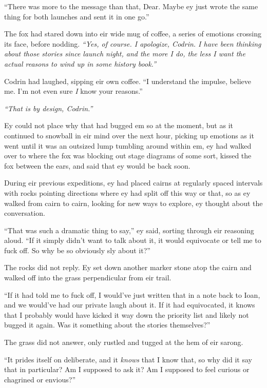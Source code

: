 ``There was more to the message than that, Dear. Maybe ey just wrote the same thing for both launches and sent it in one go.''

The fox had stared down into eir wide mug of coffee, a series of emotions crossing its face, before nodding. \emph{``Yes, of course. I apologize, Codrin. I have been thinking about those stories since launch night, and the more I do, the less I want the actual reasons to wind up in some history book.''}

Codrin had laughed, sipping eir own coffee. ``I understand the impulse, believe me. I'm not even sure \emph{I} know your reasons.''

\emph{``That is by design, Codrin.''}

Ey could not place why that had bugged em so at the moment, but as it continued to snowball in eir mind over the next hour, picking up emotions as it went until it was an outsized lump tumbling around within em, ey had walked over to where the fox was blocking out stage diagrams of some sort, kissed the fox between the ears, and said that ey would be back soon.

During eir previous expeditions, ey had placed cairns at regularly spaced intervals with rocks pointing directions where ey had split off this way or that, so as ey walked from cairn to cairn, looking for new ways to explore, ey thought about the conversation.

``That was such a dramatic thing to say,'' ey said, sorting through eir reasoning aloud. ``If it simply didn't want to talk about it, it would equivocate or tell me to fuck off. So why be so obviously sly about it?''

The rocks did not reply. Ey set down another marker stone atop the cairn and walked off into the grass perpendicular from eir trail.

``If it had told me to fuck off, I would've just written that in a note back to Ioan, and we would've had our private laugh about it. If it had equivocated, it knows that I probably would have kicked it way down the priority list and likely not bugged it again. Was it something about the stories themselves?''

The grass did not answer, only rustled and tugged at the hem of eir sarong.

``It prides itself on deliberate, and it \emph{knows} that I know that, so why did it say that in particular? Am I supposed to ask it? Am I supposed to feel curious or chagrined or envious?''

